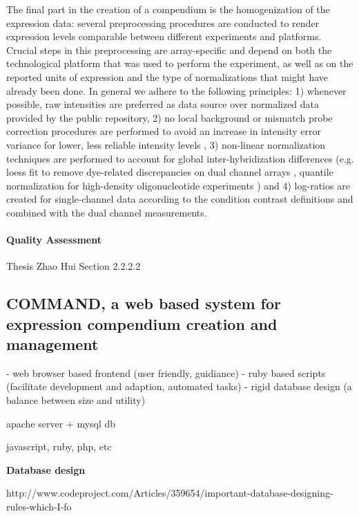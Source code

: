 The final part in the creation of a compendium is the homogenization of the 
expression data: several preprocessing procedures are conducted to render 
expression levels comparable between different experiments and platforms. 
%
Crucial steps in this preprocessing are array-specific and depend on both the 
technological platform that was used to perform the experiment, as well as on 
the reported units of expression and the type of normalizations that might have 
already been done. 
%
In general we adhere to the following principles: 
%
1) whenever possible, raw intensities are preferred as data source over 
normalized data provided by the public repository, 
%
2) no local background or mismatch probe correction procedures are performed to 
avoid an increase in intensity error variance for lower, less reliable 
intensity levels \cite{Ritchie2007,Engelen2006,Li2001}, 
%
3) non-linear normalization techniques are performed to account for global 
inter-hybridization differences (e.g. loess fit to remove dye-related 
discrepancies on dual channel arrays \cite{Yang2002}, quantile normalization 
for high-density oligonucleotide experiments \cite{Bolstad2003}) and 
%
4) log-ratios are created for single-channel data according to the condition 
contrast definitions and combined with the dual channel measurements.




\paragraph{Quality Assessment}

Thesis Zhao Hui Section 2.2.2.2








\subsection{COMMAND, a web based system for expression compendium creation and management}


- web browser based frontend (user friendly, guidiance) 
- ruby based scripts (facilitate development and adaption, automated tasks) 
- rigid database design (a balance between size and utility) 

apache server + mysql db

javascript, ruby, php, etc 


\textbf{Database design}

http://www.codeproject.com/Articles/359654/important-database-designing-rules-which-I-fo

